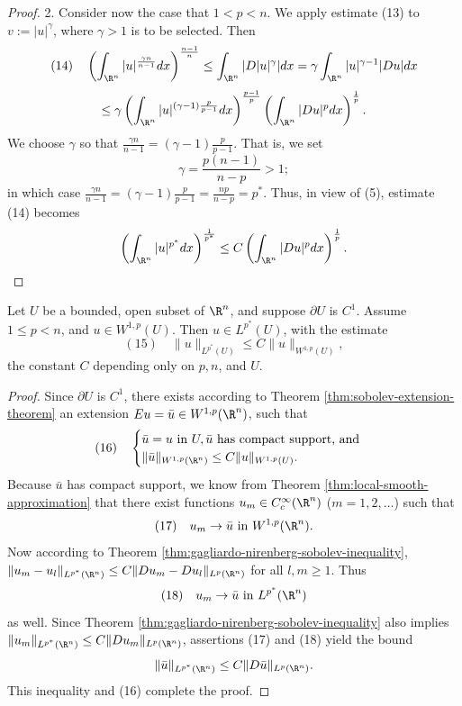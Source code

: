 \begin{proof}
2. Consider now the case that $1 < p < n$. We apply estimate (13) to $v := |u|^\gamma$, where $\gamma > 1$ is to be selected. Then
$$(14) \quad \left(\int_{\R^n} |u|^{\frac{\gamma n}{n-1}} dx\right)^{\frac{n-1}{n}} \le \int_{\R^n} |D|u|^\gamma| dx = \gamma \int_{\R^n} |u|^{\gamma-1} |Du| dx$$
$$\le \gamma \left(\int_{\R^n} |u|^{(\gamma-1)\frac{p}{p-1}} dx\right)^{\frac{p-1}{p}} \left(\int_{\R^n} |Du|^p dx\right)^{\frac{1}{p}}.$$
We choose $\gamma$ so that $\frac{\gamma n}{n-1} = (\gamma - 1)\frac{p}{p-1}$. That is, we set
$$\gamma = \frac{p(n-1)}{n-p} > 1;$$
in which case $\frac{\gamma n}{n-1} = (\gamma - 1)\frac{p}{p-1} = \frac{np}{n-p} = p^*$. Thus, in view of (5), estimate (14) becomes
$$\left(\int_{\R^n} |u|^{p^*} dx\right)^{\frac{1}{p^*}} \le C\left(\int_{\R^n} |Du|^p dx\right)^{\frac{1}{p}}.$$
\end{proof}

\begin{theorem}
\label{thm:sobolev-embedding-w1p-subcritical}
Let $U$ be a bounded, open subset of $\R^n$, and suppose $\partial U$ is $C^1$. Assume $1 \le p < n$, and $u \in W^{1,p}(U)$. Then $u \in L^{p^*}(U)$, with the estimate
$$(15) \quad \|u\|_{L^{p^*}(U)} \le C\|u\|_{W^{1,p}(U)},$$
the constant $C$ depending only on $p, n$, and $U$.
\end{theorem}

\begin{proof}
Since $\partial U$ is $C^1$, there exists according to Theorem \ref{thm:sobolev-extension-theorem} an extension $E u = \bar{u} \in W^{1,p}(\R^n)$, such that
$$(16) \quad \begin{cases}
\bar{u} = u \text{ in } U, \bar{u} \text{ has compact support, and} \\
\|\bar{u}\|_{W^{1,p}(\R^n)} \le C\|u\|_{W^{1,p}(U)}.
\end{cases}$$
Because $\bar{u}$ has compact support, we know from Theorem \ref{thm:local-smooth-approximation} that there exist functions $u_m \in C_c^\infty(\R^n)$ ($m = 1, 2, \ldots$) such that
$$(17) \quad u_m \to \bar{u} \text{ in } W^{1,p}(\R^n).$$
Now according to Theorem \ref{thm:gagliardo-nirenberg-sobolev-inequality}, $\|u_m - u_l\|_{L^{p^*}(\R^n)} \le C\|Du_m - Du_l\|_{L^p(\R^n)}$ for all $l, m \ge 1$. Thus
$$(18) \quad u_m \to \bar{u} \text{ in } L^{p^*}(\R^n)$$
as well. Since Theorem \ref{thm:gagliardo-nirenberg-sobolev-inequality} also implies $\|u_m\|_{L^{p^*}(\R^n)} \le C\|Du_m\|_{L^p(\R^n)}$, assertions (17) and (18) yield the bound
$$\|\bar{u}\|_{L^{p^*}(\R^n)} \le C\|D\bar{u}\|_{L^p(\R^n)}.$$
This inequality and (16) complete the proof.
\end{proof}


